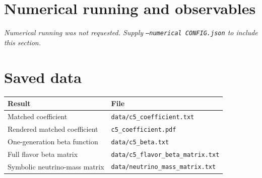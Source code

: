 \documentclass[10pt]{article}
\begin{document}
\section{Numerical running and observables}
\textit{Numerical running was not requested. Supply \texttt{--numerical CONFIG.json} to include this section.}
\section{Saved data}
\begin{center}
\begin{tabular}{l l}
\toprule
Result & File \\
\midrule
Matched coefficient & \texttt{data/c5\_coefficient.txt} \\
Rendered matched coefficient & \texttt{c5\_coefficient.pdf} \\
One-generation beta function & \texttt{data/c5\_beta.txt} \\
Full flavor beta matrix & \texttt{data/c5\_flavor\_beta\_matrix.txt} \\
Symbolic neutrino-mass matrix & \texttt{data/neutrino\_mass\_matrix.txt} \\
\bottomrule
\end{tabular}
\end{center}
\end{document}
